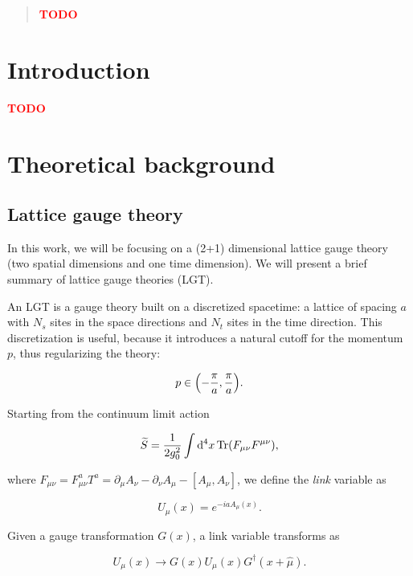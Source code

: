 \documentclass[reqno,12pt]{article}
\numberwithin{equation}{section}
\newcommand{\red}[1]{\textbf{\textcolor{red}{#1}}}
\begin{document}
\begin{abstract}
	\red{TODO}
\end{abstract}

\tableofcontents

\newpage

\section{Introduction}
\red{TODO}


\section{Theoretical background}

\subsection{Lattice gauge theory}
In this work, we will be focusing on a (2+1) dimensional lattice gauge theory (two spatial dimensions and one time dimension).
We will present a brief summary of lattice gauge theories (LGT).

An LGT is a gauge theory built on a discretized spacetime: a lattice of spacing $a$ with $N_s$ sites in the space directions
and $N_t$ sites in the time direction. This discretization is useful, because it introduces a natural cutoff for the momentum $p$, thus 
regularizing the theory:

\begin{equation}
	p \in \qty(-\frac{\pi}{a}, \frac{\pi}{a}).
\end{equation}

Starting from the continuum limit action

\begin{equation}
	\widetilde{S} = \frac{1}{2g_0^2} \int \dd[4]{x} \Tr(F_{\mu\nu}F^{\mu\nu}),
\end{equation}

where $F_{\mu\nu} = F_{\mu\nu}^a T^a = \partial_\mu A_\nu - \partial_\nu A_\mu - [A_\mu, A_\nu]$, we define the \textit{link} variable
as

\begin{equation}
	U_\mu(x) = e^{-ia A_\mu(x)}.	
\end{equation}

Given a gauge transformation $G(x)$, a link variable transforms as

\begin{equation}
	U_\mu(x) \longrightarrow G(x) U_\mu(x) G^\dagger(x+\hat{\mu}).
\end{equation}
\end{document}
